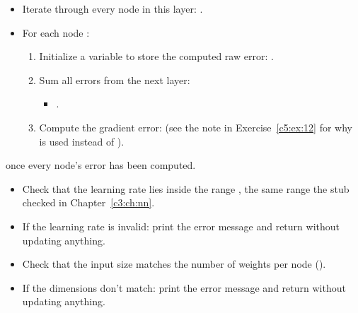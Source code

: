 \begin{itemize}
  \item Iterate through every node in this layer:
    .
  \item For each node :
  \begin{enumerate}
    \item Initialize a variable to store the computed raw error: .
    \item Sum all errors from the next layer:\newline
    \begin{itemize}
      \item {}.
    \end{itemize}
    \item Compute the gradient error:\newline
      \newline (see the note in
      Exercise~\ref{c5:ex:12} for why  is used instead of
      ).
  \end{enumerate}
\end{itemize}

 once every node's error has been computed.

\label{c5:ex:14}
\begin{itemize}
  \item Check that the learning rate lies inside the range , the same range the
    stub checked in Chapter~\ref{c3:ch:nn}.
  \item If the learning rate is invalid: print the error message 
    and return  without updating anything.
  \item Check that the input size matches the number of weights per node
    ().
  \item If the dimensions don't match: print the error message
     and return  without
    updating anything.
\end{itemize}

